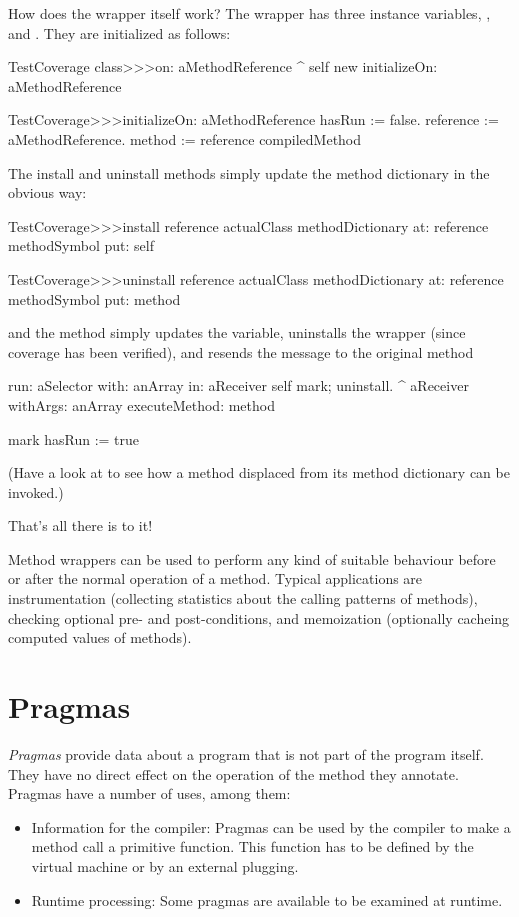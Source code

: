 \documentclass[a4paper,10pt,twoside]{book}
\begin{document}
How does the wrapper itself work?
The  wrapper has three instance variables, ,  and .
They are initialized as follows:
\begin{code}{}
TestCoverage class>>>on: aMethodReference
	^ self new initializeOn: aMethodReference

TestCoverage>>>initializeOn: aMethodReference
	hasRun := false.
	reference := aMethodReference.
	method := reference compiledMethod
\end{code}

The install and uninstall methods simply update the method dictionary in the obvious way:
\begin{code}{}
TestCoverage>>>install
	reference actualClass methodDictionary
		at: reference methodSymbol
		put: self

TestCoverage>>>uninstall
	reference actualClass methodDictionary
		at: reference methodSymbol
		put: method
\end{code}
\noindent
and the  method simply updates the  variable, uninstalls the wrapper (since coverage has been verified), and resends the message to the original method
\begin{code}{}
run: aSelector with: anArray in: aReceiver
	self mark; uninstall.
	^ aReceiver withArgs: anArray executeMethod: method

mark
	hasRun := true
\end{code}
(Have a look at  to see how a method displaced from its method dictionary can be invoked.)

That's all there is to it!

Method wrappers can be used to perform any kind of suitable behaviour before or after the normal operation of a method.  Typical applications are instrumentation (collecting statistics about the calling patterns of methods), checking optional pre- and post-conditions, and memoization (optionally cacheing computed values of methods).

\section{Pragmas}

\emph{Pragmas} provide data about a program that is not part of the program itself. They have no direct effect on the operation of the method they annotate.
Pragmas have a number of uses, among them:
\begin{itemize}
\item Information for the compiler: Pragmas can be used by the compiler to make a method call a primitive function. This function has to be defined by the virtual machine or by an external plugging.
\item Runtime processing: Some pragmas are available to be examined at runtime.
\end{itemize}
\end{document}
